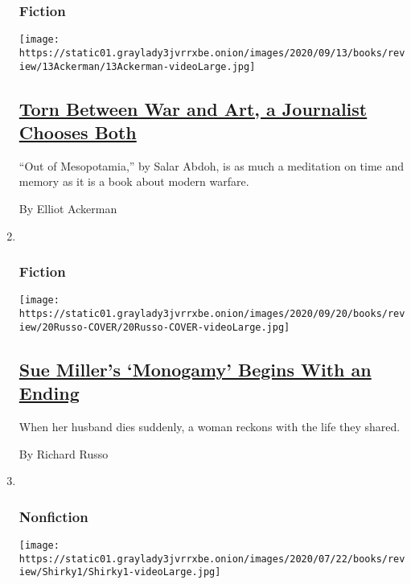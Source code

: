\begin{enumerate}
{  \subsubsection{Fiction}\label{fiction-1}}

  \texttt{[image: https://static01.graylady3jvrrxbe.onion/images/2020/09/13/books/review/13Ackerman/13Ackerman-videoLarge.jpg]}

  \hypertarget{torn-between-war-and-art-a-journalist-chooses-both}{%
  \subsection{\texorpdfstring{\href{/2020/09/01/books/review/salar-abdoh-mesopotamia.html}{Torn
  Between War and Art, a Journalist Chooses
  Both}}{Torn Between War and Art, a Journalist Chooses Both}}\label{torn-between-war-and-art-a-journalist-chooses-both}}

  ``Out of Mesopotamia,'' by Salar Abdoh, is as much a meditation on
  time and memory as it is a book about modern warfare.

  By Elliot Ackerman
\item ~
  \hypertarget{fiction-2}{%
  \subsubsection{Fiction}\label{fiction-2}}

  \texttt{[image: https://static01.graylady3jvrrxbe.onion/images/2020/09/20/books/review/20Russo-COVER/20Russo-COVER-videoLarge.jpg]}

  \hypertarget{sue-millers-monogamy-begins-with-an-ending}{%
  \subsection{\texorpdfstring{\href{/2020/09/08/books/review/sue-miller-monogamy.html}{Sue
  Miller's `Monogamy' Begins With an
  Ending}}{Sue Miller's `Monogamy' Begins With an Ending}}\label{sue-millers-monogamy-begins-with-an-ending}}

  When her husband dies suddenly, a woman reckons with the life they
  shared.

  By Richard Russo
\item ~
  \hypertarget{nonfiction-3}{%
  \subsubsection{Nonfiction}\label{nonfiction-3}}

  \texttt{[image: https://static01.graylady3jvrrxbe.onion/images/2020/07/22/books/review/Shirky1/Shirky1-videoLarge.jpg]}


\end{enumerate}
